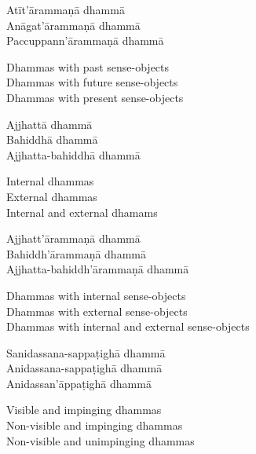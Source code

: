 \begin{pali-hang-continued}
  Atīt'ārammaṇā dhammā\\
  Anāgat'ārammaṇā dhammā\\
  Paccuppann'ārammaṇā dhammā
\end{pali-hang-continued}

\begin{english-verses}
  Dhammas with past sense-objects\\
  Dhammas with future sense-objects\\
  Dhammas with present sense-objects
\end{english-verses}

\begin{pali-hang-continued}
  Ajjhattā dhammā\\
  Bahiddhā dhammā\\
  Ajjhatta-bahiddhā dhammā
\end{pali-hang-continued}

\begin{english-verses}
  Internal dhammas\\
  External dhammas\\
  Internal and external dhamams
\end{english-verses}

\begin{pali-hang-continued}
  Ajjhatt'ārammaṇā dhammā\\
  Bahiddh'ārammaṇā dhammā\\
  Ajjhatta-bahiddh'ārammaṇā dhammā
\end{pali-hang-continued}

\begin{english-verses}
  Dhammas with internal sense-objects\\
  Dhammas with external sense-objects\\
  Dhammas with internal and external sense-objects
\end{english-verses}

\begin{pali-hang-continued}
  Sanidassana-sappaṭighā dhammā\\
  Anidassana-sappaṭighā dhammā\\
  Anidassan'āppaṭighā dhammā
\end{pali-hang-continued}

\begin{english-verses}
  Visible and impinging dhammas\\
  Non-visible and impinging dhammas\\
  Non-visible and unimpinging dhammas
\end{english-verses}

